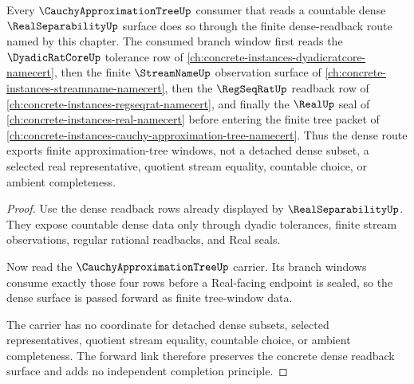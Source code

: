 \begin{theorem}\label{thm:real-separability-cauchy-approximation-tree-forward-link}
Every $\CauchyApproximationTreeUp$ consumer that reads a countable dense $\RealSeparabilityUp$ surface does so through the finite dense-readback route named by this chapter. The consumed branch window first reads the $\DyadicRatCoreUp$ tolerance row of \autoref{ch:concrete-instances-dyadicratcore-namecert}, then the finite $\StreamNameUp$ observation surface of \autoref{ch:concrete-instances-streamname-namecert}, then the $\RegSeqRatUp$ readback row of \autoref{ch:concrete-instances-regseqrat-namecert}, and finally the $\RealUp$ seal of \autoref{ch:concrete-instances-real-namecert} before entering the finite tree packet of \autoref{ch:concrete-instances-cauchy-approximation-tree-namecert}. Thus the dense route exports finite approximation-tree windows, not a detached dense subset, a selected real representative, quotient stream equality, countable choice, or ambient completeness.
\end{theorem}
\begin{proof}
Use the dense readback rows already displayed by $\RealSeparabilityUp$. They expose countable dense data only through dyadic tolerances, finite stream observations, regular rational readbacks, and Real seals.

Now read the $\CauchyApproximationTreeUp$ carrier. Its branch windows consume exactly those four rows before a Real-facing endpoint is sealed, so the dense surface is passed forward as finite tree-window data.

The carrier has no coordinate for detached dense subsets, selected representatives, quotient stream equality, countable choice, or ambient completeness. The forward link therefore preserves the concrete dense readback surface and adds no independent completion principle.
\end{proof}

